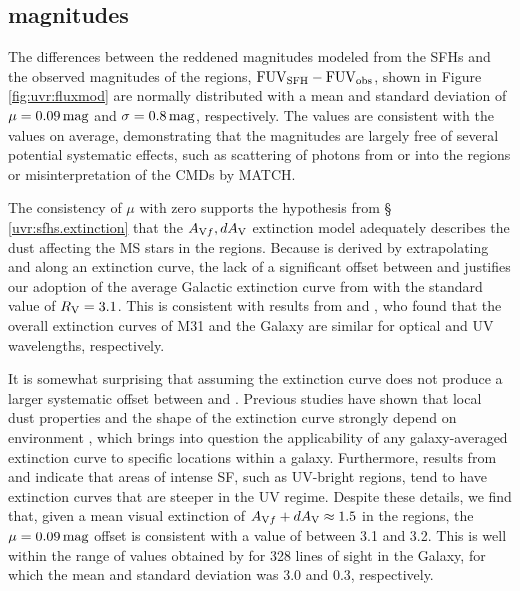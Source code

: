 \subsection{\fuv{} magnitudes}\label{uvr:discussion.fuv}

The differences between the reddened \fuv{} magnitudes modeled from the SFHs and
the observed \fuv{} magnitudes of the regions, $\mathrm{FUV}_{\mathrm{SFH}} - \mathrm{FUV}_{\mathrm{obs}}$,
shown in Figure \ref{fig:uvr:fluxmod} are normally distributed with a mean and
standard deviation of $\mu=0.09\,\mathrm{mag}$ and $\sigma=0.8\,\mathrm{mag}$,
respectively. The \fuvsfh{} values are consistent with the
\fuvobs{} values on average, demonstrating that the \fuv{} magnitudes
are largely free of several potential systematic effects, such as scattering of
\fuv{} photons from or into the regions or misinterpretation of the CMDs by MATCH.

The consistency of $\mu$ with zero supports the hypothesis from \S
\ref{uvr:sfhs.extinction} that the $A_{\mathrm{V}f},dA_\mathrm{V}$ extinction
model adequately describes the dust affecting the MS stars in the regions.
Because \afuv{} is derived by extrapolating \avf{} and
\dav{} along an extinction curve, the lack of a significant offset
between \fuvsfh{} and \fuvobs{} justifies our adoption of
the average Galactic extinction curve from \citet{Cardelli:1989} with the standard
value of $R_\mathrm{V} = 3.1$. This is consistent with results from
\citet{Barmby:2000} and \citet{Bianchi:1996}, who found that the overall extinction
curves of M31 and the Galaxy are similar for optical and UV wavelengths,
respectively.

It is somewhat surprising that assuming the \citet{Cardelli:1989} extinction curve
does not produce a larger systematic offset between \fuvsfh{} and
\fuvobs{}. Previous studies have shown that local dust properties
and the shape of the extinction curve strongly depend on environment
\citep{Fitzpatrick:2007, Bianchi:2011, Efremova:2011}, which brings into question the
applicability of any galaxy-averaged extinction curve to specific locations
within a galaxy. Furthermore, results from \citet{Bianchi:2011} and
\citet{Efremova:2011} indicate that areas of intense SF, such as UV-bright
regions, tend to have extinction curves that are steeper in the UV regime.
Despite these details, we find that, given a mean visual extinction of
$A_{\mathrm{V}f} + dA_\mathrm{V} \approx 1.5$ in the regions, the
$\mu=0.09\,\mathrm{mag}$ offset is consistent with a value of \rv{}
between 3.1 and 3.2. This is well within the range of \rv{} values
obtained by \citet{Fitzpatrick:2007} for 328 lines of sight in the Galaxy, for
which the mean and standard deviation was 3.0 and 0.3, respectively.


